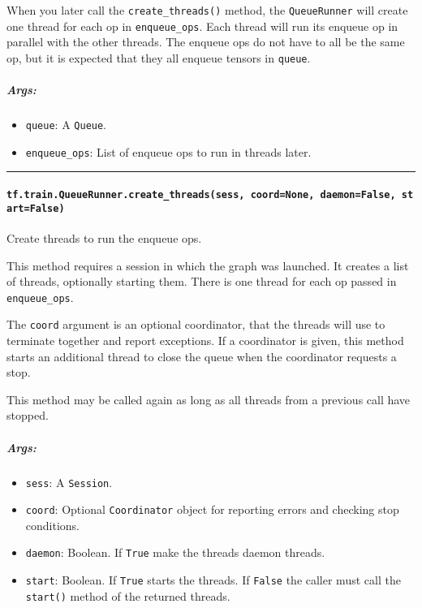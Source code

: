 When you later call the \texttt{create\_threads()} method, the
\texttt{QueueRunner} will create one thread for each op in
\texttt{enqueue\_ops}. Each thread will run its enqueue op in parallel
with the other threads. The enqueue ops do not have to all be the same
op, but it is expected that they all enqueue tensors in \texttt{queue}.

\subparagraph{Args: }\label{args-26}

\begin{itemize}
\tightlist
\item
  \texttt{queue}: A \texttt{Queue}.
\item
  \texttt{enqueue\_ops}: List of enqueue ops to run in threads later.
\end{itemize}

\begin{center}\rule{0.5\linewidth}{\linethickness}\end{center}

\paragraph{\texorpdfstring{\texttt{tf.train.QueueRunner.create\_threads(sess,\ coord=None,\ daemon=False,\ start=False)}
}{tf.train.QueueRunner.create\_threads(sess, coord=None, daemon=False, start=False) }}\label{tf.train.queuerunner.createux5fthreadssess-coordnone-daemonfalse-startfalse}

Create threads to run the enqueue ops.

This method requires a session in which the graph was launched. It
creates a list of threads, optionally starting them. There is one thread
for each op passed in \texttt{enqueue\_ops}.

The \texttt{coord} argument is an optional coordinator, that the threads
will use to terminate together and report exceptions. If a coordinator
is given, this method starts an additional thread to close the queue
when the coordinator requests a stop.

This method may be called again as long as all threads from a previous
call have stopped.

\subparagraph{Args: }\label{args-27}

\begin{itemize}
\tightlist
\item
  \texttt{sess}: A \texttt{Session}.
\item
  \texttt{coord}: Optional \texttt{Coordinator} object for reporting
  errors and checking stop conditions.
\item
  \texttt{daemon}: Boolean. If \texttt{True} make the threads daemon
  threads.
\item
  \texttt{start}: Boolean. If \texttt{True} starts the threads. If
  \texttt{False} the caller must call the \texttt{start()} method of the
  returned threads.
\end{itemize}

